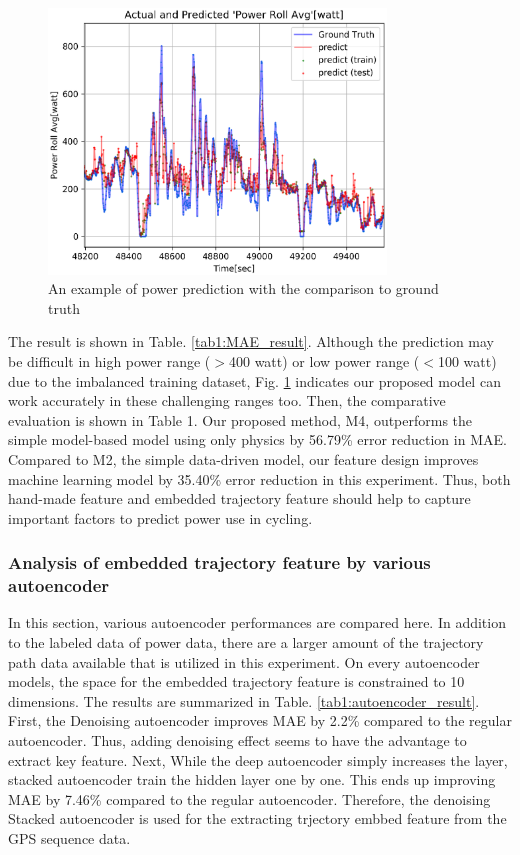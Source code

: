 \documentclass[runningheads]{llncs}
\begin{document}
 \begin{figure}[t]
  \begin{center}
  \includegraphics[width=0.8\textwidth]{fig/RF_middlePhysicsPowerRollAvgFixed_graph_7.eps}
  \caption{An example of power prediction with the comparison to ground truth}
  \label{fig:power_prediction_example}
  \end{center}
 \end{figure}

The result is shown in Table. \ref{tab1:MAE_result}. Although the
prediction may be difficult in high power range ($>$400 watt) or low power
range ($<$100 watt) due to the imbalanced training dataset, Fig.
\ref{fig:power_prediction_example} indicates our proposed model can work
accurately in these challenging ranges too.  Then, the comparative
evaluation is shown in Table 1. Our proposed method, M4, outperforms the
simple model-based model using only physics by 56.79\% error reduction in
MAE. Compared to M2, the simple data-driven model, our feature design
improves machine learning model by 35.40\% error reduction in this
experiment. Thus, both hand-made feature and embedded trajectory feature
should help to capture important factors to predict power use in
cycling.



\subsubsection{Analysis of embedded trajectory feature by various autoencoder}
In this section, various autoencoder performances are compared here. In addition to the labeled data of power data, there are a larger amount of the trajectory path data available that is utilized in this experiment. 
On every autoencoder models, the space for the embedded trajectory
feature is constrained to 10 dimensions. The results are summarized in Table. \ref{tab1:autoencoder_result}. First, the Denoising autoencoder improves MAE by 2.2\% compared to the regular autoencoder. Thus, adding denoising effect seems to have the advantage to extract key feature. Next, While the deep autoencoder simply increases the layer, stacked autoencoder train the hidden layer one by one. This ends up improving MAE by 7.46\% compared to the regular autoencoder. Therefore, the denoising Stacked autoencoder is used for the extracting trjectory embbed feature from the GPS sequence data.
\end{document}

